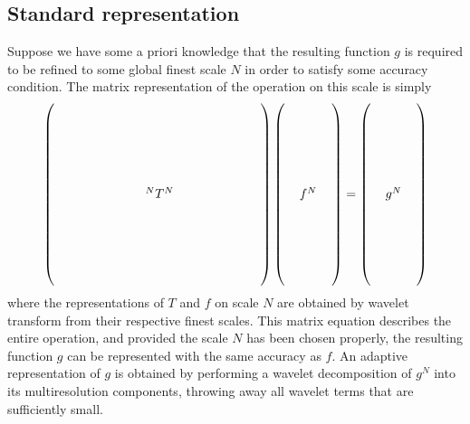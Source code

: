 \subsection*{Standard representation}
Suppose we have some a priori knowledge that the resulting function $g$ is
required to be refined to some global finest scale $N$ in order to satisfy
some accuracy condition. The matrix representation of the operation on this 
scale is simply
\begin{equation}
\begin{split} 
	\label{eq:Tmatrix}
	\left(
	\begin{array}{c}
		$\multirow{12}{*}{$
		\ \ \ \  \ \ \ \ \ \ \ \ \ \ \ \ \ \ \ \ ^NT^N
		\ \ \ \ \ \ \ \ \ \ \ \ \ \ \ \ \ \ \ $}$
		\\ \\ \\ \\ \\ \\ \\ \\ \\ \\ \\ \\
	\end{array}
	\right) \left(
	\begin{array}{c}
		$\multirow{12}{*}{$\ \ f^N\ \ $}$\\ \\ \\ \\ \\ \\ \\ \\ \\ \\ \\ \\
	\end{array}
	\right)	= \left(
	\begin{array}{c}
		$\multirow{12}{*}{$\ \ g^N\ \ $}$\\ \\ \\ \\ \\ \\ \\ \\ \\ \\ \\ \\
	\end{array}
	\right)
\end{split}
\end{equation}
where the representations of $T$ and $f$ on scale $N$ are obtained by wavelet
transform from their respective finest scales. This matrix equation describes
the entire operation, and provided the scale $N$ has been chosen properly, the
resulting function $g$ can be represented with the same accuracy as $f$. An
adaptive representation of $g$ is obtained by performing a wavelet
decomposition of $g^N$ into its multiresolution components, throwing away all
wavelet terms that are sufficiently small.\\

